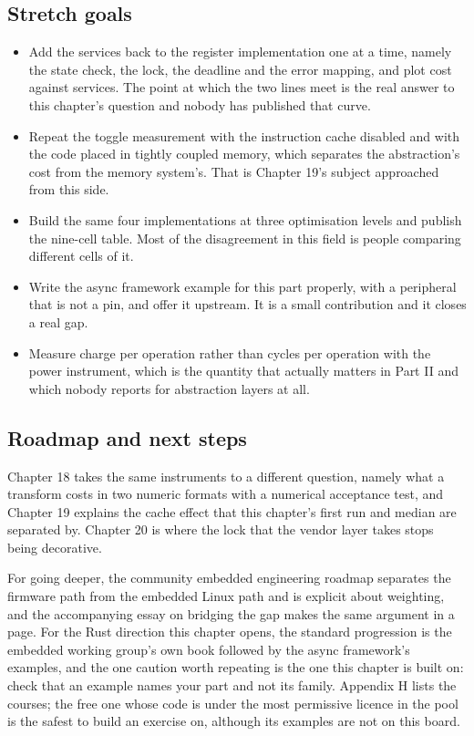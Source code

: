 \subsection*{Stretch goals}

\begin{itemize}
\item Add the services back to the register implementation one at a time,
namely the state check, the lock, the deadline and the error mapping, and plot
cost against services. The point at which the two lines meet is the real answer
to this chapter's question and nobody has published that curve.
\item Repeat the toggle measurement with the instruction cache disabled and with
the code placed in tightly coupled memory, which separates the abstraction's
cost from the memory system's. That is Chapter 19's subject approached from this
side.
\item Build the same four implementations at three optimisation levels and
publish the nine-cell table. Most of the disagreement in this field is people
comparing different cells of it.
\item Write the async framework example for this part properly, with a
peripheral that is not a pin, and offer it upstream. It is a small contribution
and it closes a real gap.
\item Measure charge per operation rather than cycles per operation with the
power instrument, which is the quantity that actually matters in Part II and
which nobody reports for abstraction layers at all.
\end{itemize}

\subsection*{Roadmap and next steps}

Chapter 18 takes the same instruments to a different question, namely what a
transform costs in two numeric formats with a numerical acceptance test, and
Chapter 19 explains the cache effect that this chapter's first run and median
are separated by. Chapter 20 is where the lock that the vendor layer takes stops
being decorative.

For going deeper, the community embedded engineering roadmap separates the
firmware path from the embedded Linux path and is explicit about weighting, and
the accompanying essay on bridging the gap makes the same argument in a page.
For the Rust direction this chapter opens, the standard progression is the
embedded working group's own book followed by the async framework's examples,
and the one caution worth repeating is the one this chapter is built on: check
that an example names your part and not its family. Appendix H lists the
courses; the free one whose code is under the most permissive licence in the
pool is the safest to build an exercise on, although its examples are not on
this board.

